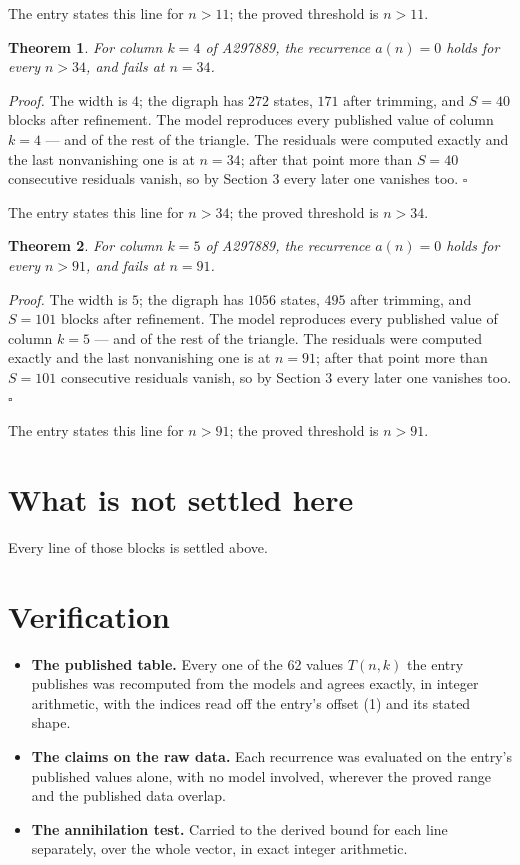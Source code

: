 \documentclass[11pt]{article}
\newtheorem{theorem}{Theorem}
\theoremstyle{definition}
\begin{document}
The entry states this line for $n > 11$; the proved threshold is $n > 11$.

\begin{theorem} For column $k = 4$ of A297889, the recurrence $a(n) = 0$ holds for every $n > 34$, and fails at $n = 34$.\end{theorem}

{\itshape Proof.} The width is $4$; the digraph has $272$ states, $171$ after trimming, and $S = 40$ blocks after refinement. The model reproduces every published value of column $k = 4$ --- and of the rest of the triangle. The residuals were computed exactly and the last nonvanishing one is at $n = 34$; after that point more than $S = 40$ consecutive residuals vanish, so by Section 3 every later one vanishes too. $\square$

The entry states this line for $n > 34$; the proved threshold is $n > 34$.

\begin{theorem} For column $k = 5$ of A297889, the recurrence $a(n) = 0$ holds for every $n > 91$, and fails at $n = 91$.\end{theorem}

{\itshape Proof.} The width is $5$; the digraph has $1056$ states, $495$ after trimming, and $S = 101$ blocks after refinement. The model reproduces every published value of column $k = 5$ --- and of the rest of the triangle. The residuals were computed exactly and the last nonvanishing one is at $n = 91$; after that point more than $S = 101$ consecutive residuals vanish, so by Section 3 every later one vanishes too. $\square$

The entry states this line for $n > 91$; the proved threshold is $n > 91$.

\section{What is not settled here}

Every line of those blocks is settled above.

\section{Verification}

\begin{itemize}

\item {\bfseries The published table.} Every one of the 62 values $T(n,k)$ the entry publishes was recomputed from the models and agrees exactly, in integer arithmetic, with the indices read off the entry's offset (1) and its stated shape.

\item {\bfseries The claims on the raw data.} Each recurrence was evaluated on the entry's published values alone, with no model involved, wherever the proved range and the published data overlap.

\item {\bfseries The annihilation test.} Carried to the derived bound for each line separately, over the whole vector, in exact integer arithmetic.

\end{itemize}
\end{document}
